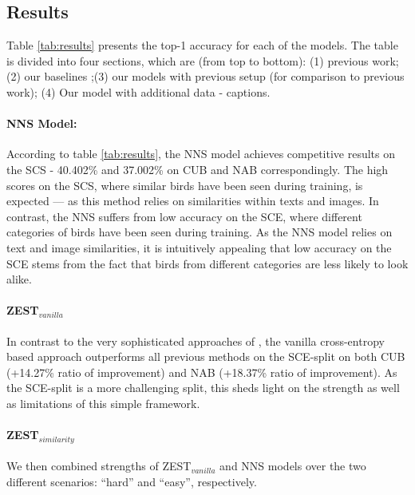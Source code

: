 \documentclass[11pt,a4paper]{article}
\newcommand\yuval[1]{\textcolor{darkpink}{\textbf{YUVAL:} #1 }}
\begin{document}
\subsection{Results}
Table \ref{tab:results} presents the top-1 accuracy for each of the models. 
The table is divided into four sections, which are (from top to bottom): 
(1) previous work; (2) our baselines ;(3) our models with previous setup (for comparison to previous work); (4) Our model with additional data - captions. 

\paragraph{NNS Model:} 
According to table \ref{tab:results}, the NNS model achieves competitive results on the SCS - 40.402\% and 37.002\% on CUB and NAB correspondingly. The high scores on the SCS, where similar birds have been seen during training, is expected --- as this method relies on similarities within texts and images. 
%
In contrast, the NNS suffers from low accuracy on the SCE, where different categories of birds have been seen during training. As the NNS model relies on text and image similarities, it is intuitively appealing that low accuracy on the SCE stems from the fact that birds from different categories are less likely to look alike. 

\paragraph{ZEST$_{vanilla}$}
In contrast to the very sophisticated approaches of \citet{zhu2018generative}, the vanilla cross-entropy based approach %
outperforms all previous methods on the SCE-split on both CUB (+14.27\% ratio of improvement) and NAB (+18.37\% ratio of improvement). As the SCE-split is a more challenging split, this sheds light on the strength as well as limitations of this simple framework. 

\paragraph{ZEST$_{similarity}$}

We then combined strengths of ZEST$_{vanilla}$ and NNS models over the two different scenarios: \enquote{hard} and \enquote{easy}, respectively. 
\end{document}
